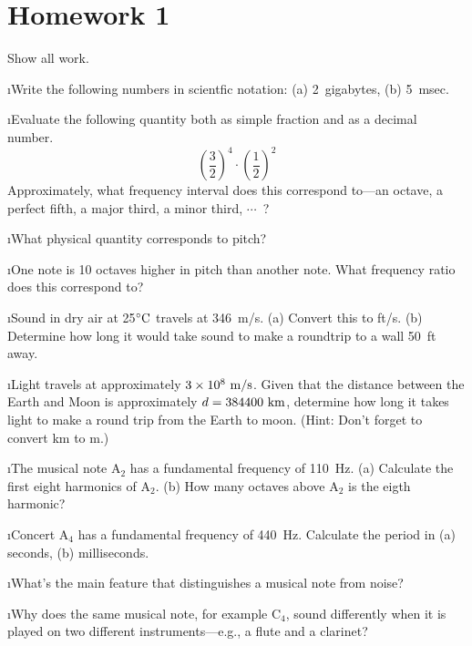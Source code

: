 \section{Homework 1}

\noindent
Show all work.

\ben
\i Write the following numbers in scientfic notation:
(a) 2~gigabytes,
(b) 5~msec.

\i Evaluate the following quantity both as simple fraction 
and as a decimal
number. 
$$
\left(\frac{3}{2}\right)^4\cdot \left(\frac{1}{2}\right)^2
$$
Approximately, what frequency interval does this
correspond to---an octave, a perfect fifth, a major third, 
a minor third, $\cdots$\ ?

\i What physical quantity corresponds to pitch?

\i One note is 10 octaves higher in pitch than another note.
What frequency ratio does this correspond to?

\i Sound in dry air at 25$^\circ{\rm C}$ travels at 346~{\rm m/s}.
(a) Convert this to ft/s.
(b) Determine how long it would take sound to make a 
roundtrip to a wall 50~ft away.

\i Light travels at approximately $3\times 10^8~{\rm m/s}$.
Given that the distance between the Earth and Moon is 
approximately $d=384400~{\rm km}$, determine how long it takes 
light to make a round trip from the Earth to moon.
(Hint: Don't forget to convert km to m.)

\i The musical note A$_2$ has a fundamental frequency of 110~Hz.
(a) Calculate the first eight harmonics of A$_2$.
(b) How many octaves above A$_2$ is the eigth harmonic?

\i Concert A$_4$ has a fundamental frequency of 440~Hz.
Calculate the period in 
(a) seconds, 
(b) milliseconds.

\i What's the main feature that distinguishes a musical note
from noise?

\i Why does the same musical note, for example C$_4$, sound 
differently when it is played on two different instruments---e.g., 
a flute and a clarinet?

\een

